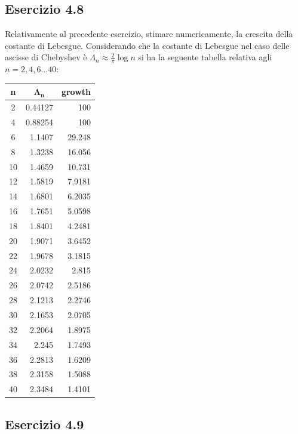 	\subsection {Esercizio 4.8}
	
Relativamente al precedente esercizio, stimare numericamente, la crescita della costante di Lebesgue.
\PP
Considerando che la costante di Lebesgue nel caso delle ascisse di Chebyshev è $\Lambda_n \approx \frac{2}{\pi}\log{n} $ si ha la seguente tabella relativa agli $n=2,4,6 ... 40$:
\begin{tabular}{ c | r | r }
\textbf{n} & \multicolumn{1}{c}{$\mathbf{\Lambda_n}$} & \multicolumn{1}{c}{\textbf{growth}}\\
\hline
      2   &  0.44127  &     100  \\
      4   &  0.88254  &     100  \\
      6   &   1.1407  &  29.248  \\
      8   &   1.3238  &  16.056  \\
     10   &   1.4659  &  10.731  \\
     12   &   1.5819  &  7.9181  \\
     14   &   1.6801  &  6.2035  \\
     16   &   1.7651  &  5.0598  \\
     18   &   1.8401  &  4.2481  \\
     20   &   1.9071  &  3.6452  \\
     22   &   1.9678  &  3.1815  \\
     24   &   2.0232  &   2.815  \\
     26   &   2.0742  &  2.5186  \\
     28   &   2.1213  &  2.2746  \\
     30   &   2.1653  &  2.0705  \\
     32   &   2.2064  &  1.8975  \\
     34   &    2.245  &  1.7493  \\
     36   &   2.2813  &  1.6209  \\
     38   &   2.3158  &  1.5088  \\
     40   &   2.3484  &  1.4101  \\
\end{tabular}



	\subsection {Esercizio 4.9}
	
